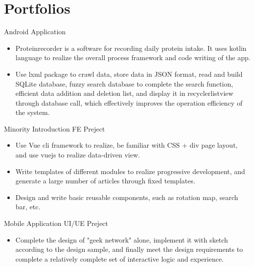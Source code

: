 \documentclass{resume}
\newcommand{\en}[1]{#1}
\newcommand{\zh}[1]{}
\begin{document}
\section{\en{Portfolios}\zh{个人项目}}
\en{Android Application}
\zh{安卓应用}
\begin{itemize}
      \item \en{Proteinrecorder is a software for recording daily protein intake. It uses kotlin language to realize the overall process framework and code writing of the app.}
            \zh{ProteinRecorder 是记录日常蛋白质摄入量的软件，用Kotlin语言实现app的整体流程框架和代码编写。}
      \item \en{Use lxml package to crawl data, store data in JSON format, read and build SQLite database, fuzzy search database to complete the search function, efficient data addition and deletion list, and display it in recyclerlistview through database call, which effectively improves the operation efficiency of the system.}
            \zh{使用 lxml 包爬取数据，json格式存储数据，读取并构建SQLite数据库，模糊搜索数据库以完成搜索功能， 高效的数据添加和删除列表，通过数据库的调用显示到RecyclerListView中，有效的提升了系统的运行效率。}
\end{itemize}

\en{Minority Introduction FE Preject}
\zh{少数民族 Web 前端项目}
\begin{itemize}
      \item \en{Use Vue cli framework to realize, be familiar with CSS + div page layout, and use vuejs to realize data-driven view.}
            \zh{使用vue-cli框架来实现，熟悉CSS+DIV页面布局，用Vuejs实现数据驱动视图。}
      \item \en{Write templates of different modules to realize progressive development, and generate a large number of articles through fixed templates.}
            \zh{编写不同模块的template来实现渐进式开发，通过固定模板实现大量文章的生成。}
      \item \en{Design and write basic reusable components, such as rotation map, search bar, etc.}
            \zh{设计并编写基础可复用的组件，如轮播图，搜索栏等。}
\end{itemize}

\en{Mobile Application UI/UE Preject}
\zh{极客网”交互设计方案}
\begin{itemize}
      \item \en{Complete the design of "geek network" alone, implement it with sketch according to the design sample, and finally meet the design requirements to complete a relatively complete set of interactive logic and experience.}
            \zh{独自完成”极客网”的设计，并按照设计样稿，采用Sketch进行实现，最终符合设计要求完成一套比较 完整的交互逻辑和体验。}
\end{itemize}
\end{document}
